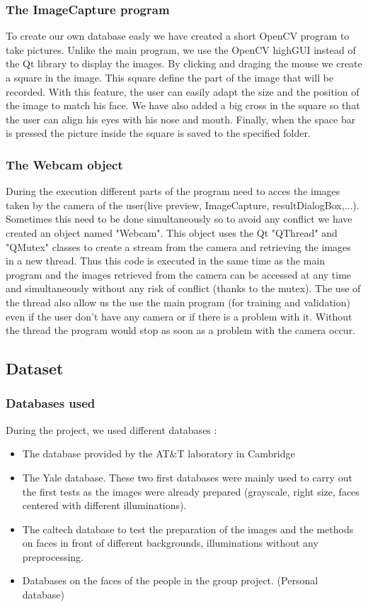\subsubsection{The ImageCapture program}
To create our own database easly we have created a short OpenCV program to take pictures. Unlike the main program, we use the OpenCV highGUI instead 
of the Qt library to display the images. By clicking and draging the mouse we create a square in the image. This square define the part of the image 
that will be recorded. With this feature, the user can easily adapt the size and the position of the image to match his face. We have also added a 
big cross in the square so that the user can align his eyes with his nose and mouth.
Finally, when the space bar is pressed the picture inside the square is saved to the specified folder.

\subsubsection{The Webcam object}
During the execution different parts of the program need to acces the images taken by the camera of the user(live preview, ImageCapture, 
resultDialogBox,...). Sometimes this need to be done simultaneously so to avoid any conflict we have created an object named "Webcam". This object 
uses the Qt "QThread" and "QMutex" classes to create a stream from the camera and retrieving the images in a new thread. Thus this code is executed 
in the same time as the main program and the images retrieved from the camera can be accessed at any time and simultaneously without any risk of 
conflict (thanks to the mutex).
The use of the thread also allow us the use the main program (for training and validation) even if the user don't have any camera or if there is a 
problem with it. Without the thread the program would stop as soon as a problem with the camera occur.

\subsection{Dataset}
\subsubsection{Databases used}
During the project, we used different databases :
\begin{itemize}
 \item The database provided by the AT\&T laboratory in Cambridge
\item The Yale database. These two first databases were mainly used to carry out the first tests as the images were already prepared (grayscale, right size, faces centered with different illuminations).
\item The caltech database to test the preparation of the images and the methods on faces in front of different backgrounds, illuminations without any preprocessing.
\item Databases on the faces of the people in the group project. (Personal database)
\end{itemize}

